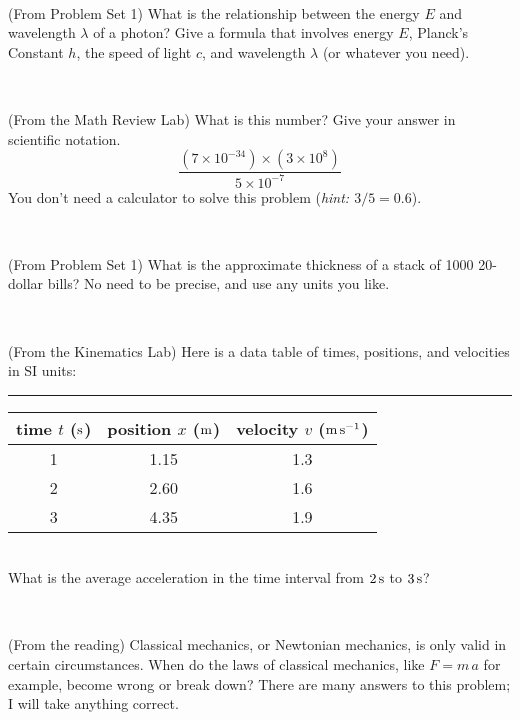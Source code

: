 \documentclass[12pt, letterpaper]{article}
\begin{document}
\vfill ~

\begin{problem} (From Problem Set 1)
What is the relationship between the energy $E$ and wavelength
$\lambda$ of a photon? Give a formula that involves energy $E$,
Planck's Constant $h$, the speed of light $c$, and wavelength
$\lambda$ (or whatever you need).
\end{problem}

\vfill ~


\clearpage


\begin{problem} (From the Math Review Lab)
What is this number? Give your answer in scientific notation.
$$
\frac{(7\times10^{-34})\times(3\times10^8)}{5\times10^{-7}}
$$
You don't need a calculator to solve this problem (\textit{hint: $3/5=0.6$}).
\end{problem}


\vfill ~

\begin{problem} (From Problem Set 1)
What is the approximate thickness of a stack of 1000 20-dollar bills?
No need to be precise, and use any units you like.
\end{problem}


\vfill ~

\begin{problem} (From the Kinematics Lab)
Here is a data table of times, positions, and velocities in SI units:\\
\rule{1.0in}{0pt}\begin{tabular}{c|c|c}
time $t$ ($\mathrm{s}$) & position $x$ ($\mathrm{m}$) & velocity $v$ ($\mathrm{m}\,\mathrm{s}^{-1}$) \\
\hline
1 & 1.15 & 1.3 \\
2 & 2.60 & 1.6 \\
3 & 4.35 & 1.9 \\
\hline
\end{tabular}\\
What is the average acceleration in the time interval from $2\,\mathrm{s}$ to $3\,\mathrm{s}$?
\end{problem}


\vfill ~

\begin{problem} (From the reading)
Classical mechanics, or Newtonian mechanics, is only valid in certain
circumstances. When do the laws of classical mechanics, like $F =
m\,a$ for example, become wrong or break down? There are many answers
to this problem; I will take anything correct.
\end{problem}
\end{document}
